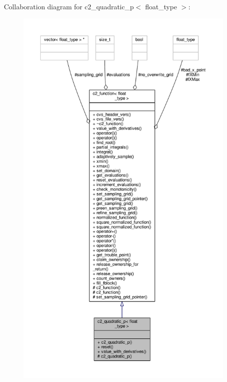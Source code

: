 Collaboration diagram for c2\+\_\+quadratic\+\_\+p$<$ float\+\_\+type $>$\+:
\nopagebreak
\begin{figure}[H]
\begin{center}
\leavevmode
\includegraphics[height=550pt]{classc2__quadratic__p__coll__graph}
\end{center}
\end{figure}
